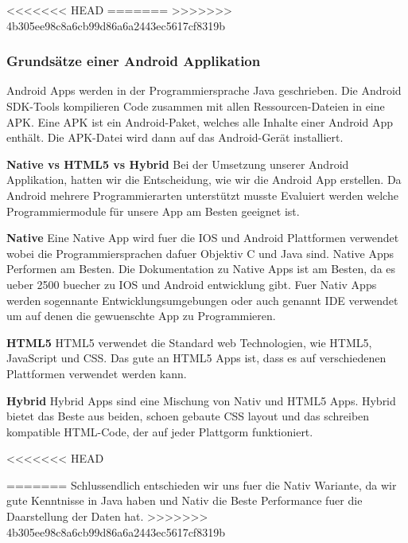 <<<<<<< HEAD
=======
>>>>>>> 4b305ee98c8a6cb99d86a6a2443ec5617cf8319b
\subsubsection{Grundsätze einer Android Applikation}
\label{subsec:aapp-fundam}

Android Apps werden in der Programmiersprache Java geschrieben.
Die Android SDK-Tools kompilieren Code zusammen mit allen Ressourcen-Dateien in eine APK.
Eine APK ist ein Android-Paket, welches alle Inhalte einer Android App enthält. 
Die APK-Datei wird dann auf das Android-Gerät installiert. 


\textbf{Native vs HTML5 vs Hybrid}
Bei der Umsetzung unserer Android Applikation, hatten wir die Entscheidung, wie wir die Android App erstellen. 
Da Android mehrere Programmierarten unterstützt musste Evaluiert werden welche Programmiermodule für unsere App am Besten geeignet ist. \nextline

\textbf{Native\newline} 
Eine Native App wird fuer die IOS und Android Plattformen verwendet wobei die Programmiersprachen dafuer Objektiv C und Java sind.
Native Apps Performen am Besten.
Die Dokumentation zu Native Apps ist am Besten, da es ueber 2500 buecher zu IOS und Android entwicklung gibt.
Fuer Nativ Apps werden sogennante Entwicklungsumgebungen oder auch genannt IDE verwendet um auf denen die gewuenschte App zu Programmieren.\nextline

\textbf{HTML5\newline} 
HTML5 verwendet die Standard web Technologien, wie HTML5, JavaScript und CSS. Das gute an HTML5 Apps ist, dass es auf verschiedenen Plattformen verwendet werden kann.\nextline

\textbf{Hybrid\newline} 
Hybrid Apps sind eine Mischung von Nativ und HTML5 Apps. Hybrid bietet das Beste aus beiden, schoen gebaute CSS layout und das schreiben kompatible HTML-Code, der auf jeder Plattgorm funktioniert.\nextline

<<<<<<< HEAD

=======
Schlussendlich entschieden wir uns fuer die Nativ Wariante, da wir gute Kenntnisse in Java haben und Nativ die Beste Performance fuer die Daarstellung der Daten hat.
>>>>>>> 4b305ee98c8a6cb99d86a6a2443ec5617cf8319b
\clearpage %